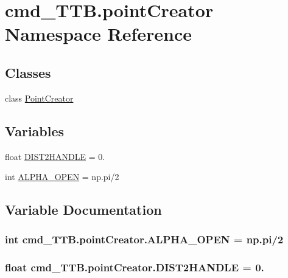 \hypertarget{namespacecmd__TTB_1_1pointCreator}{}\section{cmd\+\_\+\+T\+T\+B.\+point\+Creator Namespace Reference}
\label{namespacecmd__TTB_1_1pointCreator}
\subsection*{Classes}
\begin{DoxyCompactItemize}
\item 
class \hyperlink{classcmd__TTB_1_1pointCreator_1_1PointCreator}{Point\+Creator}
\end{DoxyCompactItemize}
\subsection*{Variables}
\begin{DoxyCompactItemize}
\item 
float \hyperlink{namespacecmd__TTB_1_1pointCreator_ac5dba97d9771fcc542d662e2c6304115}{D\+I\+S\+T2\+H\+A\+N\+D\+LE} = 0.
\item 
int \hyperlink{namespacecmd__TTB_1_1pointCreator_a9cdfd77249436867b4079bfdb3df6682}{A\+L\+P\+H\+A\+\_\+\+O\+P\+EN} = np.\+pi/2
\end{DoxyCompactItemize}


\subsection{Variable Documentation}
\subsubsection[{\texorpdfstring{A\+L\+P\+H\+A\+\_\+\+O\+P\+EN}{ALPHA_OPEN}}]{\setlength{\rightskip}{0pt plus 5cm}int cmd\+\_\+\+T\+T\+B.\+point\+Creator.\+A\+L\+P\+H\+A\+\_\+\+O\+P\+EN = np.\+pi/2}\hypertarget{namespacecmd__TTB_1_1pointCreator_a9cdfd77249436867b4079bfdb3df6682}{}\label{namespacecmd__TTB_1_1pointCreator_a9cdfd77249436867b4079bfdb3df6682}
\subsubsection[{\texorpdfstring{D\+I\+S\+T2\+H\+A\+N\+D\+LE}{DIST2HANDLE}}]{\setlength{\rightskip}{0pt plus 5cm}float cmd\+\_\+\+T\+T\+B.\+point\+Creator.\+D\+I\+S\+T2\+H\+A\+N\+D\+LE = 0.}\hypertarget{namespacecmd__TTB_1_1pointCreator_ac5dba97d9771fcc542d662e2c6304115}{}\label{namespacecmd__TTB_1_1pointCreator_ac5dba97d9771fcc542d662e2c6304115}

